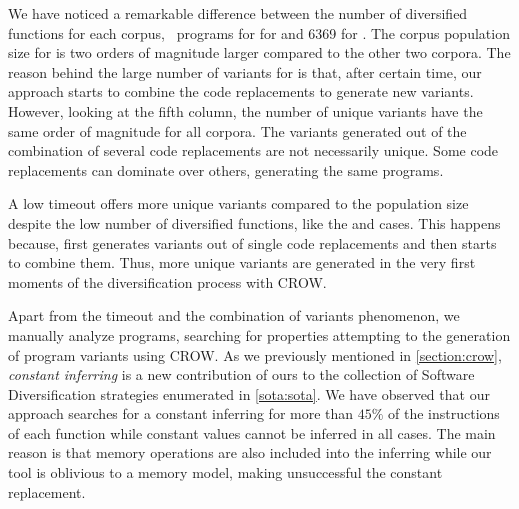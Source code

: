 We have noticed a remarkable difference between the number of diversified functions for each corpus, \rossetapopulation\ programs for  for \corpussodium and 6369 for \corpusqrcode. The corpus population size for \corpusrosetta is two orders of magnitude larger compared to the other two corpora. The reason behind the large number of variants for \corpusrosetta is that, after certain time, our approach starts to combine the code replacements to generate new variants. However, looking at the fifth column, the number of unique variants have the same order of magnitude for all corpora.
The variants generated out of the combination of several code replacements are not necessarily unique. Some code replacements can dominate over others, generating the same \wasm programs.

A low timeout offers more unique variants compared to the population size despite the low number of diversified functions, like the \corpussodium and \corpusqrcode cases. This happens because, first generates variants out of single code replacements and then starts to combine them. Thus, more unique variants are generated in the very first moments of the diversification process with CROW.


Apart from the timeout and the combination of variants phenomenon, we manually analyze programs, searching for properties attempting to the generation of program variants using CROW.
As we previously mentioned in \autoref{section:crow}, \emph{constant inferring} is a new contribution of ours to the collection of Software Diversification strategies enumerated in \autoref{sota:sota}. 
We have observed that our approach searches for a constant inferring for more than $45\%$ of the instructions of each function while constant values cannot be inferred in all cases. The main reason is that memory operations are also included into the inferring while our tool is oblivious to a memory model, making unsuccessful the constant replacement.


